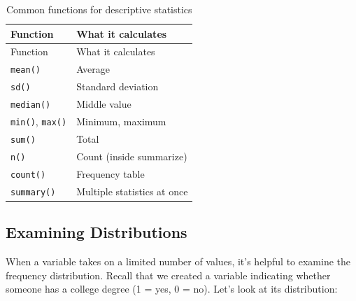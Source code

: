 \documentclass[
  letterpaper,
  DIV=11,
  numbers=noendperiod]{scrreprt}
\begin{document}
\begin{tcolorbox}[enhanced jigsaw, arc=.35mm, bottomrule=.15mm, bottomtitle=1mm, breakable, colback=white, colbacktitle=quarto-callout-tip-color!10!white, colframe=quarto-callout-tip-color-frame, coltitle=black, left=2mm, leftrule=.75mm, opacityback=0, opacitybacktitle=0.6, rightrule=.15mm, title=\textcolor{quarto-callout-tip-color}{\faLightbulb}\hspace{0.5em}{Quick Reference: Common Summary Functions}, titlerule=0mm, toprule=.15mm, toptitle=1mm]

\begin{longtable}[]{@{}ll@{}}
\caption{Common functions for descriptive
statistics}\label{tbl-summary-funcs}\tabularnewline
\toprule\noalign{}
Function & What it calculates \\
\midrule\noalign{}
\endfirsthead
\toprule\noalign{}
Function & What it calculates \\
\midrule\noalign{}
\endhead
\bottomrule\noalign{}
\endlastfoot
\texttt{mean()} & Average \\
\texttt{sd()} & Standard deviation \\
\texttt{median()} & Middle value \\
\texttt{min()}, \texttt{max()} & Minimum, maximum \\
\texttt{sum()} & Total \\
\texttt{n()} & Count (inside summarize) \\
\texttt{count()} & Frequency table \\
\texttt{summary()} & Multiple statistics at once \\
\end{longtable}

\end{tcolorbox}

\subsection{Examining Distributions}\label{examining-distributions}

When a variable takes on a limited number of values, it's helpful to
examine the frequency distribution. Recall that we created a variable
indicating whether someone has a college degree (1 = yes, 0 = no). Let's
look at its distribution:
\end{document}
